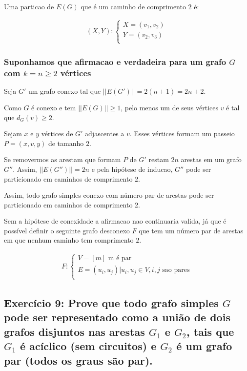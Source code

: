 \documentclass{article}
\begin{document}
Uma particao de $E(G)$ que é um caminho de comprimento $2$ é:

\begin{align}
	(X,Y) : 
	\begin{cases} 
		X = (v_1, v_2) \\
		Y = (v_2, v_3) \\
	\end{cases}
\end{align}
 
 
  \subsubsection{Suponhamos que afirmacao e verdadeira para um grafo $G$ com $k = n \geq 2$ vértices} 
  
  Seja $G'$ um grafo conexo tal que $||E(G')|| = 2(n+1) = 2n + 2$.
  
  Como $G$ é conexo e tem $||E(G)|| \geq 1$, pelo menos um de seus vértices $v$ é tal que $d_G(v) \geq 2$.
  
  Sejam $x$ e $y$ vértices de $G'$ adjascentes a $v$. Esses vértices formam um passeio $P = (x,v,y)$ de tamanho $2$.
  
  Se removermos as arestam que formam $P$ de $G'$ restam $2n$ arestas em um grafo $G''$. Assim, $||E(G'')|| = 2n$ e pela hipótese de inducao, $G''$ pode ser particionado em caminhos de comprimento $2$.
  
  Assim, todo grafo simples conexo com  número par de arestas pode ser particionado em caminhos de comprimento $2$. 
  
  Sem a hipótese de conexidade a afirmacao nao continuaria valida, já que é possível definir o seguinte grafo desconexo $F$ que tem um número par de arestas em que nenhum caminho tem comprimento $2$.
 
  \begin{align}
  	F : 
  	\begin{cases} 
  		V = [m] \text{   m é par} \\
  		E = {(u_i, u_j) | u_i, u_j \in V, i , j\text{   sao pares} }\\
  	\end{cases}
  \end{align}
  
  
  \clearpage
  
   \subsection{Exercício 9: Prove que todo grafo simples $G$ pode ser representado como a união de dois grafos disjuntos nas arestas $G_1$ e $G_2$, tais que $G_1$ é acíclico (sem circuitos) e $G_2$ é um grafo par (todos os graus são par).}
      
\end{document}
